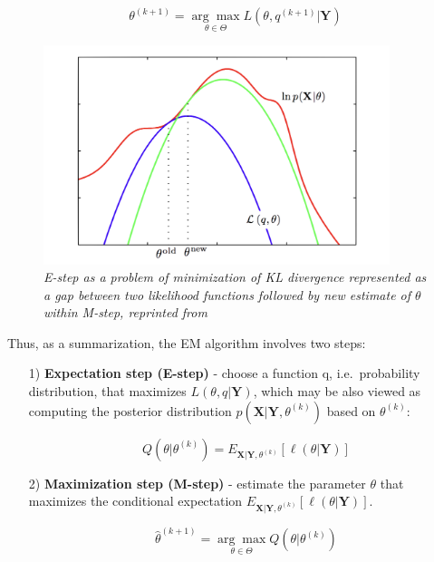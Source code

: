 \begin{equation}
    \theta^{(k+1)} = \underset{\theta \in \Theta}{\arg\max} L(\theta, q^{(k+1)}|\textbf{Y})
\end{equation}

\begin{figure}[ht]

    \begin{center}
        \includegraphics[width=0.9\textwidth]{Figs/Loglike.png}
    \end{center}

    \caption[Construction of log-likelihood lower bound in EM algorithm]{\textit{E-step as a problem of minimization of KL divergence represented as a gap between two likelihood functions followed by new estimate of $\theta$ within M-step, reprinted from \citep{Bishop2006}}}
    \label{fig:Loglike}
\end{figure}

\noindent Thus, as a summarization, the EM algorithm involves two steps:

\begin{itemize}
\item[1)] \textbf{Expectation step (E-step)} - choose a function q, i.e.\ probability distribution, that maximizes $L(\theta, q|\textbf{Y})$, which may be also viewed as 
                                               computing the posterior distribution $p(\textbf{X}|\textbf{Y},\theta^{(k)})$ based on $\theta^{(k)}$:

\begin{equation}
    Q(\theta|\theta^{(k)}) = E_{\textbf{X}|\textbf{Y},\theta^{(k)}} [\ell(\theta|\textbf{Y})]
\end{equation}

\item[2)] \textbf{Maximization step (M-step)} - estimate the parameter $\theta$ that maximizes the conditional expectation $E_{\textbf{X}|\textbf{Y},\theta^{(k)}} [\ell(\theta|\textbf{Y})]$.

\begin{equation}
    \hat{\theta}^{(k+1)} = \underset{\theta \in \Theta}{\arg\max} Q(\theta|\theta^{(k)}) 
\end{equation}

\end{itemize}

